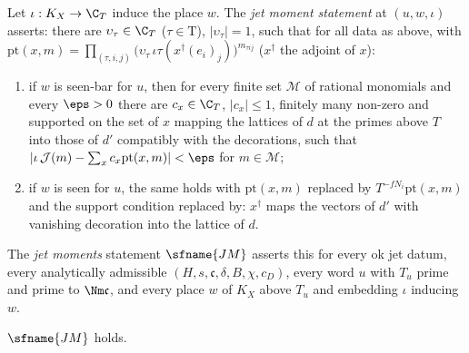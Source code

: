 \begin{definition}\label{pf:rows:defjm}
Let $\iota:K_X\to\C_T$ induce the place $w$. The \emph{jet moment statement} at $(u,w,\iota)$ asserts: there are
$\upsilon_\tau\in\C_T$ ($\tau\in\mathrm T$), $|\upsilon_\tau|=1$, such that for all data as above, with
$\mathrm{pt}(x,m)=\prod_{(\tau,i,j)}\bigl(\upsilon_\tau\,\iota\tau(x^\dagger(e_i)_j)\bigr)^{m_{\tau ij}}$ ($x^\dagger$ the adjoint of $x$):
\begin{enumerate}[label=(\alph*)]
\item if $w$ is seen-bar for $u$, then for every finite set $\mathcal M$ of rational monomials and every $\eps>0$ there are
$c_x\in\C_T$, $|c_x|\le1$, finitely many non-zero and supported on the set of $x$ mapping the lattices of $d$ at the primes
above $T$ into those of $d'$ compatibly with the decorations, such that $|\iota\,\mathcal J(m)-\sum_xc_x\mathrm{pt}(x,m)|<\eps$
for $m\in\mathcal M$;
\item if $w$ is seen for $u$, the same holds with $\mathrm{pt}(x,m)$ replaced by $T^{-fN_i}\mathrm{pt}(x,m)$ and the support
condition replaced by: $x^\dagger$ maps the vectors of $d'$ with vanishing decoration into the lattice of $d$.
\end{enumerate}
The \emph{jet moments} statement $\sfname{JM}$ asserts this for every ok jet datum, every analytically admissible
$(H,s,\mathfrak c,\delta,B,\chi,c_D)$, every word $u$ with $T_u$ prime and prime to $\Nm\mathfrak c$, and every place $w$ of $K_X$
above $T_u$ and embedding $\iota$ inducing $w$.
\end{definition}

\begin{theorem}\label{pf:rows:jetmoments}
$\sfname{JM}$ holds.
\end{theorem}


